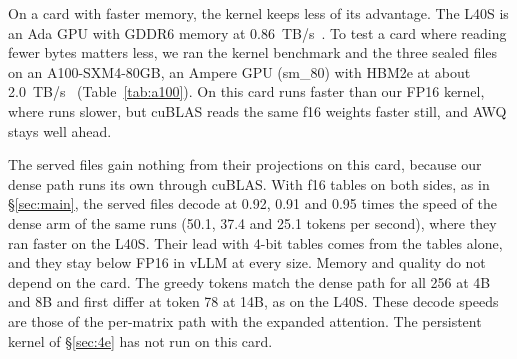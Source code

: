 On a card with faster memory, the kernel keeps less of its advantage. The
L40S is an Ada GPU with GDDR6 memory at
0.86~TB/s~\citep{nvidia_l40s_datasheet}. To test a card where reading fewer
bytes matters less, we ran the kernel benchmark and the three sealed files on
an A100-SXM4-80GB, an Ampere GPU (sm\_80) with HBM2e at about
2.0~TB/s~\citep{nvidia_a100_datasheet} (Table~\ref{tab:a100}). On this card
\Tetra{} runs faster than our FP16 kernel, where \Planes{} runs slower, but
cuBLAS reads the same f16 weights faster still, and AWQ stays well ahead.

The served files gain nothing from their projections on this card, because
our dense path runs its own through cuBLAS. With f16 tables on both sides, as in
\S\ref{sec:main}, the served files decode at 0.92, 0.91 and 0.95 times the speed of the dense
arm of the same runs (50.1, 37.4 and 25.1 tokens per second), where they ran
faster on the L40S. Their lead with 4-bit tables comes
from the tables alone, and they stay below FP16 in vLLM at every size. Memory
and quality do not depend on the card. The greedy tokens match the dense path for all 256 at 4B
and 8B and first differ at token 78 at 14B, as on the L40S. These decode
speeds are those of the per-matrix path with the expanded attention. The persistent kernel
of \S\ref{sec:4e} has not run on this card.
